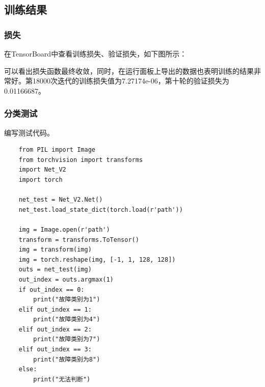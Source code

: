 \documentclass{article}
\begin{document}
	\subsection{训练结果}
	
	\subsubsection{损失}
	
	在TensorBoard中查看训练损失、验证损失，如下图所示：
	
	\begin{figure}[ht]
		\centering
	\end{figure}

	可以看出损失函数最终收敛，同时，在运行面板上导出的数据也表明训练的结果非常好。第18000次迭代的训练损失值为7.27174e-06，第十轮的验证损失为0.01166687。
	
	\subsubsection{分类测试}
	
	编写测试代码。
	
	\begin{lstlisting}
	from PIL import Image
	from torchvision import transforms
	import Net_V2
	import torch
		
	net_test = Net_V2.Net()
	net_test.load_state_dict(torch.load(r'path'))
		
	img = Image.open(r'path')
	transform = transforms.ToTensor()
	img = transform(img)
	img = torch.reshape(img, [-1, 1, 128, 128])
	outs = net_test(img)
	out_index = outs.argmax(1)
	if out_index == 0:
		print("故障类别为1")
	elif out_index == 1:
		print("故障类别为4")
	elif out_index == 2:
		print("故障类别为7")
	elif out_index == 3:
		print("故障类别为8")
	else:
		print("无法判断")
	\end{lstlisting}
	
\end{document}
